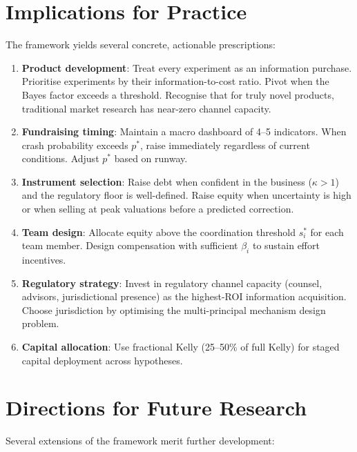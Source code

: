 \documentclass[12pt,a4paper,oneside]{book}
\theoremstyle{definition}
\theoremstyle{remark}
\begin{document}
\section{Implications for Practice}

The framework yields several concrete, actionable prescriptions:

\begin{enumerate}
  \item \textbf{Product development}: Treat every experiment as an information purchase.
    Prioritise experiments by their information-to-cost ratio. Pivot when the Bayes
    factor exceeds a threshold. Recognise that for truly novel products, traditional
    market research has near-zero channel capacity.
  \item \textbf{Fundraising timing}: Maintain a macro dashboard of 4--5 indicators.
    When crash probability exceeds $p^*$, raise immediately regardless of current
    conditions. Adjust $p^*$ based on runway.
  \item \textbf{Instrument selection}: Raise debt when confident in the business
    ($\kappa > 1$) and the regulatory floor is well-defined. Raise equity when
    uncertainty is high or when selling at peak valuations before a predicted correction.
  \item \textbf{Team design}: Allocate equity above the coordination threshold $s_i^*$
    for each team member. Design compensation with sufficient $\beta_i$ to sustain
    effort incentives.
  \item \textbf{Regulatory strategy}: Invest in regulatory channel capacity (counsel,
    advisors, jurisdictional presence) as the highest-ROI information acquisition.
    Choose jurisdiction by optimising the multi-principal mechanism design problem.
  \item \textbf{Capital allocation}: Use fractional Kelly (25--50\% of full Kelly)
    for staged capital deployment across hypotheses.
\end{enumerate}

\section{Directions for Future Research}

Several extensions of the framework merit further development:
\end{document}
